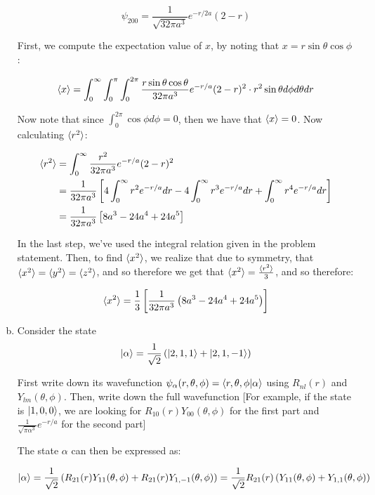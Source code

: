 \documentclass[10pt]{article}
\begin{document}
\begin{enumerate}[(a)]
\begin{solution}
            \[ \psi_{200} = \frac{1}{\sqrt{32\pi a^3}} e^{-r/2a}(2-r)\]

            First, we compute the expectation value of $x$, by noting that $x = r \sin \theta \cos \phi$: 

            \[ \langle x \rangle = \int_0^\infty \int_0^\pi \int_0^{2\pi} \frac{r \sin \theta \cos \theta}{32 \pi a^3} e^{-r/a}(2-r)^2 \cdot r^2 \sin \theta d\phi d \theta dr\] 

            Now note that since $\int_0^{2\pi} \cos \phi d\phi = 0$, then we have that $\langle x \rangle = 0$. Now calculating $\langle r^2 \rangle$: 

            \begin{align*}
                \langle r^2 \rangle &= \int_0^\infty \frac{r^2}{32\pi a^3} e^{-r/a}(2-r)^2\\
                &= \frac{1}{32 \pi a^3} \left[ 4\int_0^\infty r^2e^{-r/a} dr - 4\int_0^\infty r^3e^{-r/a} dr + \int_0^\infty r^4 e^{-r/a} dr \right]\\
                &= \frac{1}{32 \pi a^3} \left[8a^3 - 24 a^4 + 24 a^5\right]
            \end{align*}

            In the last step, we've used the integral relation given in the problem statement. Then, to find $\langle x^2 \rangle$, we realize that due to symmetry, that $\langle x^2 \rangle = \langle y^2 \rangle = \langle z^2 \rangle$, and so therefore we get that $\langle x^2 \rangle = \frac{\langle r^2 \rangle}{3}$, and so therefore:

            \[ \langle x^2 \rangle = \frac13 \left[ \frac{1}{32 \pi a^3} \left(8a^3 - 24 a^4 + 24 a^5\right) \right]\] 


        \end{solution}
        \item Consider the state
        \[ \ket \alpha = \frac{1}{\sqrt{2}} \left( \ket{2, 1, 1} + \ket{2, 1, -1}\right)\] 

        First write down its wavefunction $\psi_\alpha(r, \theta, \phi) = \braket{r, \theta, \phi}{\alpha}$ using $R_{nl}(r)$ and $Y_{lm}(\theta, \phi)$. Then, write down the full wavefunction [For example, if the state is $\ket{1, 0, 0}$, we are looking for $R_{10}(r)Y_{00}(\theta, \phi)$ for the first part and $\frac{1}{\sqrt{\pi \alpha^3}}e^{-r/a}$ for the second part]


        \begin{solution}
            The state $\alpha$ can then be expressed as: 

            \[ \ket{\alpha} = \frac{1}{\sqrt{2}} \left( R_{21}(r) Y_{11}(\theta, \phi) + R_{21}(r) Y_{1, -1}(\theta, \phi)\right) = \frac{1}{\sqrt{2}}R_{21}(r) \left( Y_{11}(\theta, \phi) + Y_{1,1}(\theta, \phi)\right) \] 


\end{solution}
\end{enumerate}
\end{document}

